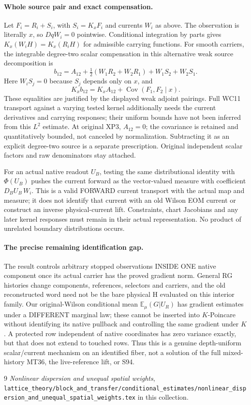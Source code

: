\documentclass[11pt]{article}
\newcommand{\E}{\mathbb E}
\newcommand{\Cov}{\operatorname{Cov}}
\begin{document}
\paragraph{Whole source pair and exact compensation.}
Let $F_i=R_i+S_i$, with $S_i=K_xF_i$ and currents $W_i$ as above. The observation is
literally $x$, so $DqW_i=0$ pointwise. Conditional integration by parts gives
$K_x(W_iH)=K_x(R_iH)$ for admissible carrying functions.
For smooth carriers, the integrable degree-two scalar compensation in this alternative
weak source decomposition is
\[
 b_{12}=A_{12}+\tfrac12(W_1R_2+W_2R_1)+W_1S_2+W_2S_1.
\]
Here $W_iS_j=0$ because $S_j$ depends only on $x$, and
\[
 K_xb_{12}=K_xA_{12}+\Cov(F_1,F_2\mid x).
\]
These equalities are justified by the displayed weak adjoint pairings. Full WC11
transport against a varying tested kernel additionally needs the current derivatives and
carrying responses; their uniform bounds have not been inferred from this $L^2$ estimate.
At original XP3, $A_{12}=0$; the covariance is retained and quantitatively bounded,
not canceled by normalization. Subtracting it as an explicit degree-two source is a separate
prescription. Original independent scalar factors and raw denominators stay attached.

For an actual native readout $U_B$, testing the same distributional identity with
$\Phi(U_B)$ pushes the current forward as the vector-valued measure with coefficient
$D_BU_B\,W_i$. This is a valid FORWARD current transport with the actual map and measure;
it does not identify that current with an old Wilson EOM current or construct an inverse
physical-current lift. Constraints, chart Jacobians and any later kernel responses must
remain in their actual representation. No product of unrelated boundary distributions occurs.

\paragraph{The precise remaining identification gap.}
The result controls arbitrary stopped observations INSIDE ONE native component once its
actual carrier has the proved gradient norm. General RG histories change components,
references, selectors and carriers, and the old reconstructed word need not be the bare
physical H evaluated on this interior family. Our original-Wilson conditional mean
$\E_\mu(G|U_R)$ has gradient estimates under a DIFFERENT marginal law; these cannot
be inserted into $K$-Poincare without identifying its native pullback and controlling the
same gradient under $K$. A protected row independent of native coordinates has zero
variance exactly, but that does not extend to touched rows.
Thus this is a genuine depth-uniform scalar/current mechanism on an identified fiber,
not a solution of the full mixed-history MT36, the live-reference lift, or S94.
\begin{thebibliography}{9}
 \emph{Nonlinear dispersion and unequal spatial weights}, \texttt{lattice\_theory/block\_and\_transfer/conditional\_estimates/nonlinear\_dispersion\_and\_unequal\_spatial\_weights.tex} in this collection.
\end{thebibliography}
\end{document}
